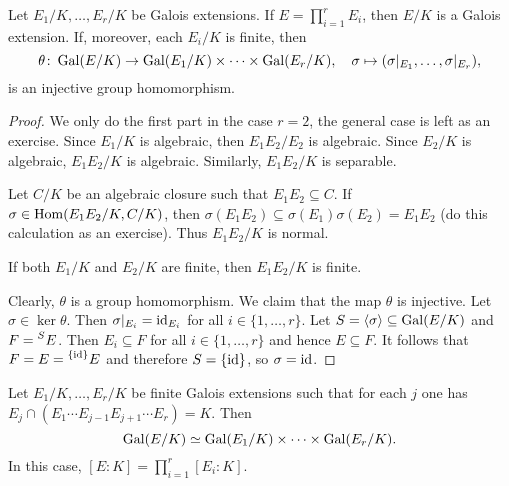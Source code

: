 \begin{proposition}
Let $E_1/K,\dots,E_r/K$ be Galois extensions. 
If $E=\prod_{i=1}^rE_i$, then $E/K$ is a Galois extension. If, moreover, each $E_i/K$ is finite,
then 
\[
\theta\colon \operatorname{Gal}(E/K)\to \operatorname{Gal}(E_1/K)\times\cdots\times\operatorname{Gal}(E_r/K),
\quad
\sigma\mapsto(\sigma|_{E_1},\dots,\sigma|_{E_r}),
\]
is an injective group homomorphism.
\end{proposition}

\begin{proof}
    We only do the first part in the case $r=2$, the general case is left as an exercise. Since $E_1/K$ is algebraic, 
    then $E_1E_2/E_2$ is algebraic. Since $E_2/K$ is algebraic, $E_1E_2/K$ is algebraic. Similarly, 
    $E_1E_2/K$ is separable. 
    
    Let $C/K$ be an algebraic closure such that $E_1E_2\subseteq C$. If $\sigma\in\operatorname{Hom}(E_1E_2/K,C/K)$, then 
    $\sigma(E_1E_2)\subseteq\sigma(E_1)\sigma(E_2)=E_1E_2$ (do this calculation as an exercise). 
    Thus $E_1E_2/K$ is normal. 
    
    If both $E_1/K$ and $E_2/K$ are finite, then $E_1E_2/K$ is finite. 
    
    Clearly, $\theta$ is a group homomorphism. We claim that the map $\theta$ is injective. Let $\sigma\in\ker\theta$. Then
    $\sigma|_{E_i}=\operatorname{id}_{E_i}$ for all $i\in\{1,\dots,r\}$. Let $S=\langle\sigma\rangle\subseteq\operatorname{Gal}(E/K)$ and
    $F=\prescript{S}{}{E}$. Then $E_i\subseteq F$ for all $i\in\{1,\dots,r\}$ and
    hence $E\subseteq F$. It follows that $F=E=\prescript{\{\operatorname{id}\}}{}{E}$ and therefore $S=\{\operatorname{id}\}$, so 
    $\sigma=\operatorname{id}$. 
\end{proof}

\begin{exercise}
    Let $E_1/K,\dots,E_r/K$ be finite Galois extensions such that for each $j$ 
    one has $E_j\cap (E_1\cdots E_{j-1}E_{j+1}\cdots E_r)=K$. Then 
    \[
    \operatorname{Gal}(E/K)\simeq\operatorname{Gal}(E_1/K)\times\cdots\times\operatorname{Gal}(E_r/K).
    \]
    In this case, $[E:K]=\prod_{i=1}^r[E_i:K]$. 
\end{exercise}

